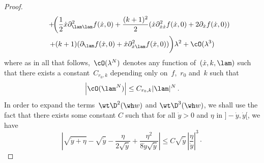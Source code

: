 \begin{proof}
\begin{multline}
\qquad +\!\bigg(\frac12\dot x\partial^2_{\lam\lam}f(\dot x,0) +\frac{(k+1)^2}2(\dot x\partial^2_{\dot x\dot x}f(\dot x,0)+2\partial_{\dot x}f(\dot x,0))\\
+ (k+1) (\partial_{\lam}f(\dot x,0)+ \dot x\partial^2_{\dot x\lam}f(\dot x,0))\bigg)\lambda^2 +\cO(\lambda^3)
\end{multline}
where as in all that follows,~$\cO(\lambda^N)$ denotes any function of~$(\dot x,k,\lam)$ such that there exists a constant~$C_{r_0,k}$ depending only on~$f$,~$r_0$ and~$k$ such that
\[
\left|\cO(\lam^N)\right| \leq C_{r_0,k} |\lam|^N\,.
\]
In order to expand the terms~$\wt\D^2(\wh w)$ and $\wt\D^3(\wh w)$, we shall use the fact that there exists some constant $C$ such that for all $\dot y>0$ and $\eta$ in $]-\dot y,\dot y[$, we have
\begin{equation}\label{eq:y}
\left| \sqrt{\dot y+\eta}-\sqrt{\dot y}-\frac\eta{2\sqrt{\dot y}}+\frac{\eta^2}{8\dot y\sqrt{\dot y}}\right| \leq C\sqrt{\dot y}\,\left | \frac\eta{\dot y}\right|^{3}\cdotp
\end{equation}


\end{proof}

